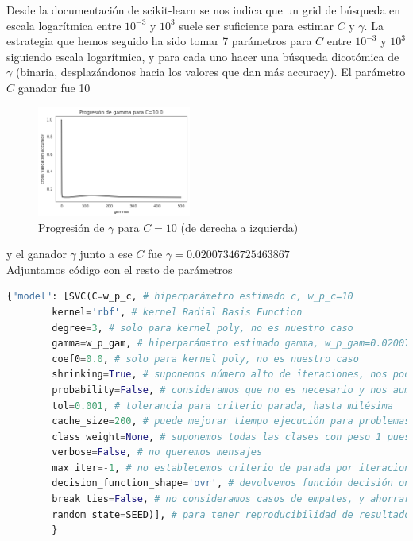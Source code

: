 \documentclass[11pt,a4paper]{article}
\theoremstyle{definition}
\begin{document}
	Desde la documentación de scikit-learn se nos indica que un grid de búsqueda en escala logarítmica entre $10^{-3}$ y $10^3$ suele ser suficiente para estimar $C$ y $\gamma$.
	La estrategia que hemos seguido ha sido tomar 7 parámetros para $C$ entre $10^{-3}$ y $10^3$ siguiendo escala logarítmica, y para cada uno hacer una búsqueda dicotómica de $\gamma$ (binaria, desplazándonos hacia los valores que dan más accuracy). El parámetro $C$ ganador fue 10 
	\begin{figure}[H]
		\centering
		\includegraphics[width=0.45\textwidth]{images/prog_gamma}
		\caption{Progresión de $\gamma$ para $C=10$ (de derecha a izquierda)}
		\end{figure}
	y el ganador $\gamma$ junto a ese $C$ fue $\gamma =0.02007346725463867$\\
    Adjuntamos código con el resto de parámetros
    \begin{lstlisting}[language=Python, caption= Par\'ametros usados en SVC, inputencoding=latin1]
  {"model": [SVC(C=w_p_c, # hiperparámetro estimado c, w_p_c=10
        kernel='rbf', # kernel Radial Basis Function
        degree=3, # solo para kernel poly, no es nuestro caso
        gamma=w_p_gam, # hiperparámetro estimado gamma, w_p_gam=0.02007346725463867
        coef0=0.0, # solo para kernel poly, no es nuestro caso
        shrinking=True, # suponemos número alto de iteraciones, nos podrá ayudar a reducir tiempo de cómputo
        probability=False, # consideramos que no es necesario y nos aumentaría coste computacional
        tol=0.001, # tolerancia para criterio parada, hasta milésima
        cache_size=200, # puede mejorar tiempo ejecución para problemas de muchos datos, en nuestro caso consideramos que son pocos datos y que con 200MB sería suficiente
        class_weight=None, # suponemos todas las clases con peso 1 pues tenemos clases balanceadas
        verbose=False, # no queremos mensajes
        max_iter=-1, # no establecemos criterio de parada por iteraciones
        decision_function_shape='ovr', # devolvemos función decisión one vs rest 
        break_ties=False, # no consideramos casos de empates, y ahorraremos considerablemente en coste computacional
        random_state=SEED)], # para tener reproducibilidad de resultados
        }

	\end{lstlisting}
\end{document}
